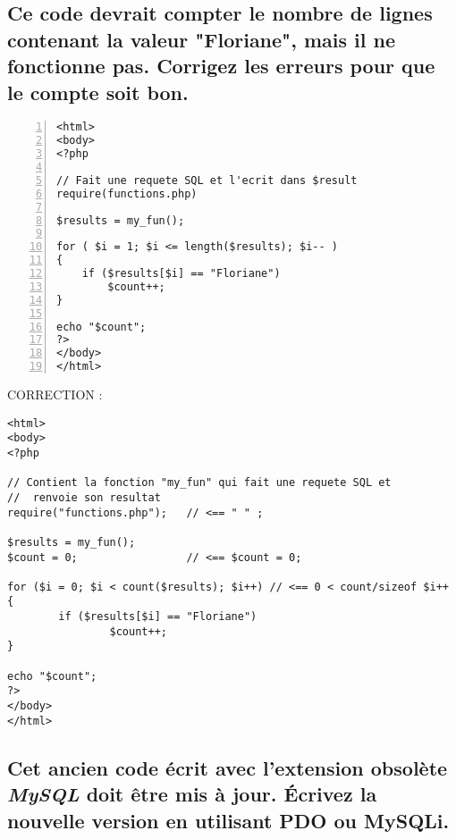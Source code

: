 \documentclass[11pt,a4paper]{article}
\begin{document}
\bigskip

\subsection{Ce code devrait compter le nombre de lignes contenant la valeur "Floriane", mais il ne fonctionne pas. Corrigez les erreurs pour que le compte soit bon.}

\medskip

\lstset{language=php}
\begin{lstlisting}[frame=single,numbers=left]
<html>
<body>
<?php

// Fait une requete SQL et l'ecrit dans $result
require(functions.php)

$results = my_fun();

for ( $i = 1; $i <= length($results); $i-- )
{
	if ($results[$i] == "Floriane")
		$count++;
}

echo "$count";
?>
</body>
</html>
\end{lstlisting}


CORRECTION :

\medskip

\lstset{language=php}
\begin{lstlisting}[frame=single]
<html>
<body>
<?php

// Contient la fonction "my_fun" qui fait une requete SQL et
//  renvoie son resultat
require("functions.php");	// <== " " ;

$results = my_fun();
$count = 0;					// <== $count = 0;

for ($i = 0; $i < count($results); $i++) // <== 0 < count/sizeof $i++
{
        if ($results[$i] == "Floriane")
                $count++;
}

echo "$count";
?>
</body>
</html>
\end{lstlisting}

\bigskip


\subsection{Cet ancien code écrit avec l'extension obsolète \textit{MySQL} doit être mis à jour. \'Ecrivez la nouvelle version en utilisant PDO ou MySQLi.}

\medskip
\end{document}
